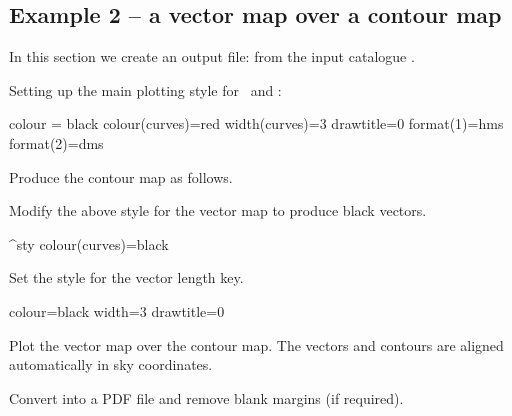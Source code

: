 \subsection{ Example 2 -- a vector map over a contour map}
\label{section:kappa-example2}


In this section we create an output file:  from the input
catalogue .

\begin{terminalv}
\end{terminalv}

Setting up the main plotting style for \contour\ and :

\begin{terminalv}
colour = black
colour(curves)=red
width(curves)=3
drawtitle=0
format(1)=hms
format(2)=dms
\end{terminalv}


Produce the contour map as follows.

\begin{terminalv}
\end{terminalv}


Modify the above style for the vector map to produce black vectors.

\begin{terminalv}
^sty
colour(curves)=black
\end{terminalv}


Set the style for the vector length key.


\begin{terminalv}
colour=black
width=3
drawtitle=0
\end{terminalv}

Plot the vector map over the contour map. The vectors and contours are
aligned automatically in sky coordinates.

\begin{terminalv}
\end{terminalv}


Convert into a PDF file and remove blank margins (if required).

\begin{terminalv}
\end{terminalv}

